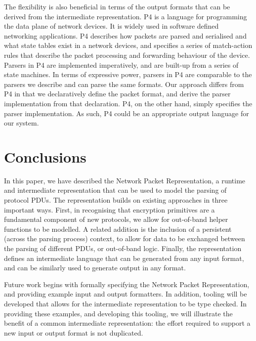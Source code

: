 \documentclass[10pt,sigconf]{acmart}
\begin{document}
The flexibility is also beneficial in terms of the output formats that can be derived from
the intermediate representation.
P4 \cite{bosshart:2014:p4,p4consortium:2018:v16spec-20180531} is a language
for programming the data plane of network devices. It is widely used in
software defined networking applications.
P4 describes how packets are parsed and serialised and what state tables
exist in a network devices, and specifies a series of match-action rules
that describe the packet processing and forwarding behaviour of the device.
Parsers in P4 are implemented imperatively, and are built-up from a series
of state machines.
In terms of expressive power, parsers in P4 are comparable to the parsers
we describe and can parse the same formats.
Our approach differs from P4 in that we declaratively define the packet
format, and derive the parser implementation from that declaration. P4,
on the other hand, simply specifies the parser implementation. As such,
P4 could be an appropriate output language for our system.

\section{Conclusions}
\label{sec:conclusion}

In this paper, we have described the Network Packet Representation, a runtime and
intermediate representation that can be used to model the parsing of protocol PDUs.
The representation
builds on existing approaches in three important ways. First, in recognising that
encryption primitives are a fundamental component of new protocols, we allow for
out-of-band helper functions to be modelled. A related addition is the inclusion of a
persistent (across the parsing process) context, to allow for data to be exchanged between
the parsing of different PDUs, or out-of-band logic. Finally, the representation defines an
intermediate language that can be generated from any input format, and can be similarly
used to generate output in any format.

Future work begins with formally specifying the Network Packet Representation, and providing
example input and output formatters. In addition, tooling will be developed that allows
for the intermediate representation to be type checked. In providing these examples, and
developing this tooling, we will illustrate the benefit of a common intermediate
representation: the effort required to support a new input or output format is not
duplicated.
\end{document}

